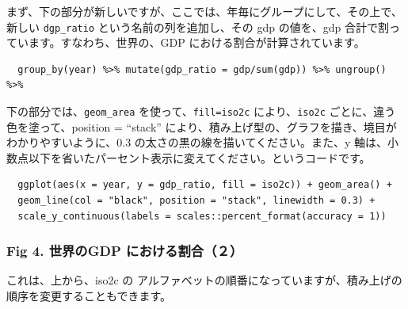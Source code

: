 \documentclass[
  xelatex, ja=standard]{bxjsbook}
\theoremstyle{definition}
\theoremstyle{definition}
\theoremstyle{definition}
\theoremstyle{definition}
\theoremstyle{remark}
\begin{document}
まず、下の部分が新しいですが、ここでは、年毎にグループにして、その上で、新しい \texttt{dgp\_ratio} という名前の列を追加し、その gdp の値を、gdp 合計で割っています。すなわち、世界の、GDP における割合が計算されています。

\begin{verbatim}
  group_by(year) %>% mutate(gdp_ratio = gdp/sum(gdp)) %>% ungroup() %>%
\end{verbatim}

下の部分では、\texttt{geom\_area} を使って、\texttt{fill=iso2c} により、\texttt{iso2c} ごとに、違う色を塗って、position = ``stack'' により、積み上げ型の、グラフを描き、境目がわかりやすいように、0.3 の太さの黒の線を描いてください。また、y 軸は、小数点以下を省いたパーセント表示に変えてください。というコードです。

\begin{verbatim}
  ggplot(aes(x = year, y = gdp_ratio, fill = iso2c)) + geom_area() +
  geom_line(col = "black", position = "stack", linewidth = 0.3) + 
  scale_y_continuous(labels = scales::percent_format(accuracy = 1))
\end{verbatim}

\hypertarget{fig-4.-ux4e16ux754cux306egdp-ux306bux304aux3051ux308bux5272ux5408uxff12}{%
\subsubsection{Fig 4. 世界のGDP における割合（２）}\label{fig-4.-ux4e16ux754cux306egdp-ux306bux304aux3051ux308bux5272ux5408uxff12}}

これは、上から、iso2c の アルファベットの順番になっていますが、積み上げの順序を変更することもできます。
\end{document}
